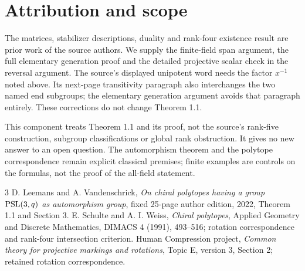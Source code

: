 \documentclass[11pt,a4paper]{article}
\begin{document}
\section{Attribution and scope}
The matrices, stabilizer descriptions, duality and rank-four existence
result are prior work of the source authors. We supply the finite-field
span argument, the full elementary generation proof and the detailed
projective scalar check in the reversal argument. The source's displayed
unipotent word needs the factor $x^{-1}$ noted above. Its next-page
transitivity paragraph also interchanges the two named end subgroups;
the elementary generation argument avoids that paragraph entirely.
These corrections do not change Theorem 1.1.

This component treats Theorem 1.1 and its proof, not the source's rank-five
construction, subgroup classifications or global rank obstruction.
It gives no new answer to an open question. The automorphism theorem
and the polytope correspondence remain explicit classical premises;
finite examples are controls on the formulas, not the proof of the
all-field statement.
\begin{thebibliography}{3}
 D. Leemans and A. Vandenschrick,
\emph{On chiral polytopes having a group $\operatorname{PSL}(3,q)$ as automorphism
group}, fixed 25-page author edition, 2022, Theorem 1.1 and Section 3.
 E. Schulte and A. I. Weiss, \emph{Chiral polytopes},
Applied Geometry and Discrete Mathematics, DIMACS 4 (1991), 493--516;
rotation correspondence and rank-four intersection criterion.
 Human Compression project,
\emph{Common theory for projective markings and rotations},
Topic E, version 3, Section 2; retained rotation correspondence.
\end{thebibliography}
\end{document}
